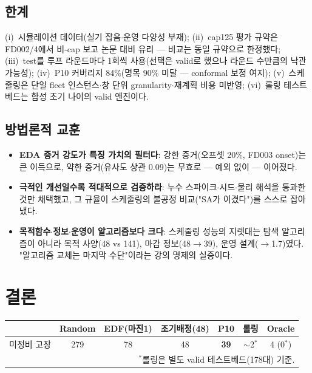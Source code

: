 \documentclass[11pt]{article}
\begin{document}
\subsection{한계}

(i)~시뮬레이션 데이터(실기 잡음$\cdot$운영 다양성 부재);
(ii)~cap125 평가 규약은 FD002/4에서 비-cap 보고 논문 대비 유리 — 비교는 동일 규약으로 한정했다;
(iii)~test를 루프 라운드마다 1회씩 사용(선택은 valid로 했으나 라운드 수만큼의 낙관 가능성);
(iv)~P10 커버리지 84\%(명목 90\% 미달 — conformal 보정 여지);
(v)~스케줄링은 단일 fleet 인스턴스$\cdot$창 단위 granularity$\cdot$재계획 비용 미반영;
(vi)~롤링 테스트베드는 합성 초기 나이의 valid 엔진이다.

\subsection{방법론적 교훈}

\begin{itemize}[nosep]
  \item \textbf{EDA 증거 강도가 특징 가치의 필터다}: 강한 증거(오프셋 20\%, FD003 onset)는 큰 이득으로,
        약한 증거(유사도 상관 0.09)는 무효로 — 예외 없이 — 이어졌다.
  \item \textbf{극적인 개선일수록 적대적으로 검증하라}: 누수 스파이크$\cdot$시드$\cdot$물리 해석을 통과한 것만 채택했고,
        그 규율이 스케줄링의 불공정 비교("SA가 이겼다")를 스스로 잡아냈다.
  \item \textbf{목적함수$\cdot$정보$\cdot$운영이 알고리즘보다 크다}: 스케줄링 성능의 지렛대는
        탐색 알고리즘이 아니라 목적 사양(48 vs 141), 마감 정보(48$\to$39), 운영 설계($\to$1.7)였다.
        "알고리즘 교체는 마지막 수단"이라는 강의 명제의 실증이다.
\end{itemize}

\section{결론}

\begin{center}
\begin{tabular}{lcccccc}
\toprule
 & Random & EDF(마진1) & 조기배정(48) & P10 & 롤링 & Oracle \\
\midrule
미정비 고장 & 279 & 78 & 48 & \textbf{39} & $\sim$2$^{*}$ & 4 (0$^{*}$) \\
\bottomrule
\multicolumn{7}{r}{\small $^{*}$롤링은 별도 valid 테스트베드(178대) 기준.}
\end{tabular}
\end{center}
\end{document}
